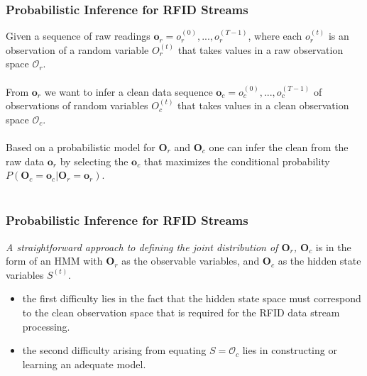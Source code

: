 \begin{frame}
\begin{columns}
\end{columns}

\end{frame}


\begin{frame}
\frametitle{Probabilistic Inference for RFID Streams}

Given a sequence of raw readings $\mathbf{o}_r = o^{(0)}_r,...,o^{(T-1)}_r$, where each $o^{(t)}_r$ is an observation of a random variable $O^{(t)}_r$ that takes values in a raw observation space $\mathcal{O}_r$. \\~\\

From $\mathbf{o}_r$ we want to infer a clean data sequence $\mathbf{o}_c = o^{(0)}_c,...,o^{(T-1)}_c$ of observations of random variables $O^{(t)}_c$ that takes values in a clean observation space $\mathcal{O}_c$. \\~\\

Based on a probabilistic model for $\mathbf{O}_r$ and $\mathbf{O}_c$ one can infer the clean from the raw data $\mathbf{o}_r$ by selecting the $\mathbf{o}_c$ that maximizes the conditional probability $P(\mathbf{O}_c = \mathbf{o}_c | \mathbf{O}_r = \mathbf{o}_r)$. \\~\\

\end{frame}


\begin{frame}
\frametitle{Probabilistic Inference for RFID Streams}

\textit{A straightforward approach to defining the joint distribution of $\mathbf{O}_r$, $\mathbf{O}_c$} is in the form of an HMM with $\mathbf{O}_r$ as the observable variables, and $\mathbf{O}_c$ as the hidden state variables $S^{(t)}$.

\begin{itemize}

  \item the first difficulty lies in the fact that the hidden state space must correspond to the clean observation space that is required for the RFID data stream processing.

  \item the second difficulty arising from equating $S = \mathcal{O}_c$ lies in constructing or learning an adequate model.

\end{itemize}

\end{frame}

